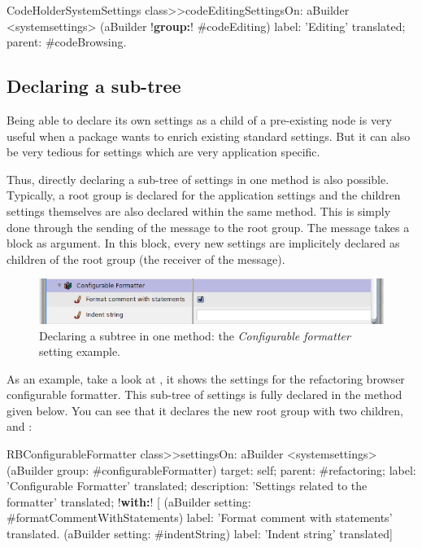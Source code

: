 \documentclass[a4paper,10pt,twoside]{book}
\begin{document}
\begin{code}{}
CodeHolderSystemSettings class>>codeEditingSettingsOn: aBuilder
	<systemsettings>
	(aBuilder !\textbf{group:}! #codeEditing) 
		label: 'Editing' translated;
		parent: #codeBrowsing.
\end{code}


\subsection{Declaring a sub-tree}
Being able to declare its own settings as a child of a pre-existing node is very useful when a package wants to enrich existing standard settings. But it can also be very tedious for settings which are very application specific. 

Thus, directly declaring a sub-tree of settings in one method is also possible. Typically, a root group is declared for the application settings and the children settings themselves are also declared within the same method. This is simply done through the sending of the  message to the root group. The  message takes a block as argument. In this block, every new settings are implicitely declared as children of the root group (the receiver of the  message). 

\begin{figure}[tbh]
\begin{center}
\includegraphics[scale=0.47]{configurableFormatter}
\caption{Declaring a subtree in one method: the \textit{Configurable formatter} setting example.}
\end{center}
\end{figure}


As an example, take a look at , it shows the settings for the refactoring browser configurable formatter. This sub-tree of settings is fully declared in the method  given below. You can see that it declares the new root group  with two children,  and :
\begin{code}{}
RBConfigurableFormatter class>>settingsOn: aBuilder
	<systemsettings>	
	(aBuilder group: #configurableFormatter)
		target: self;
		parent: #refactoring;
		label: 'Configurable Formatter' translated;
		description: 'Settings related to the formatter' translated;
		!\textbf{with:}! [
				(aBuilder setting: #formatCommentWithStatements)
					label: 'Format comment with statements' translated.
				(aBuilder setting: #indentString)
					label: 'Indent string' translated]
\end{code}
\end{document}
